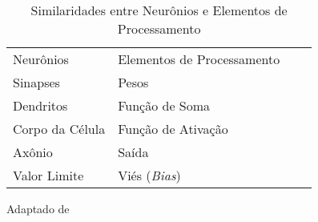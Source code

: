 \begin{table}[htp]
\centering
\caption{Similaridades entre Neurônios e Elementos de Processamento}
\begin{tabular}{llll} 
\cline{1-2}
Neurônios       & Elementos de Processamento &  &   \\ 
\cline{1-2}
Sinapses        & Pesos                      &  &   \\
Dendritos       & Função de Soma             &  &   \\
Corpo da Célula & Função de Ativação         &  &   \\
Axônio          & Saída                      &  &   \\
Valor Limite    & Viés (\textit{Bias})       &  &   \\
\cline{1-2}
\end{tabular}
\label{Tab: tabela_el_pro}

Adaptado de \cite{ref_NN_definition}
\end{table}
